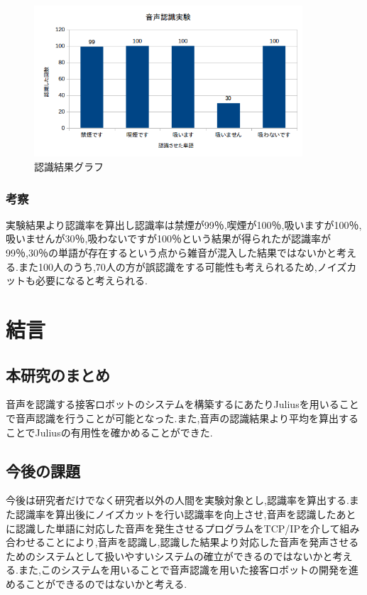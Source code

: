 \documentclass[12pt,oneside]{sotsuken_paper}
\begin{document}
\begin{figure}[htbp]
\begin{center}
\includegraphics[width=100mm]{img/result.png}
\caption{認識結果グラフ}
\label{fig:result}
\end{center}
\end{figure}


\subsection{考察}
実験結果より認識率を算出し認識率は禁煙が99％,喫煙が100％,吸いますが100％,吸いませんが30％,吸わないですが100％という結果が得られたが認識率が99％,30％の単語が存在するという点から雑音が混入した結果ではないかと考える.また100人のうち,70人の方が誤認識をする可能性も考えられるため,ノイズカットも必要になると考えられる.



\chapter{結言}
\section{本研究のまとめ}
音声を認識する接客ロボットのシステムを構築するにあたりJuliusを用いることで音声認識を行うことが可能となった.また,音声の認識結果より平均を算出することでJuliusの有用性を確かめることができた.

\section{今後の課題}
今後は研究者だけでなく研究者以外の人間を実験対象とし,認識率を算出する.また認識率を算出後にノイズカットを行い認識率を向上させ,音声を認識したあとに認識した単語に対応した音声を発生させるプログラムをTCP/IPを介して組み合わせることにより,音声を認識し,認識した結果より対応した音声を発声させるためのシステムとして扱いやすいシステムの確立ができるのではないかと考える.また,このシステムを用いることで音声認識を用いた接客ロボットの開発を進めることができるのではないかと考える.
\end{document}
